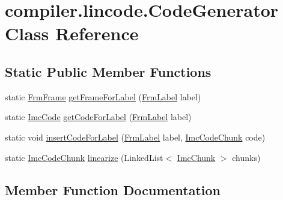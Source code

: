 \hypertarget{classcompiler_1_1lincode_1_1_code_generator}{}\section{compiler.\+lincode.\+Code\+Generator Class Reference}
\label{classcompiler_1_1lincode_1_1_code_generator}
\subsection*{Static Public Member Functions}
\begin{DoxyCompactItemize}
\item 
static \hyperlink{classcompiler_1_1frames_1_1_frm_frame}{Frm\+Frame} \hyperlink{classcompiler_1_1lincode_1_1_code_generator_a50a5eb8c751616ca66441a5f7a6eeebb}{get\+Frame\+For\+Label} (\hyperlink{classcompiler_1_1frames_1_1_frm_label}{Frm\+Label} label)
\item 
static \hyperlink{interfacecompiler_1_1imcode_1_1_imc_code}{Imc\+Code} \hyperlink{classcompiler_1_1lincode_1_1_code_generator_ab7e4686779d00b983e977ef7556802d5}{get\+Code\+For\+Label} (\hyperlink{classcompiler_1_1frames_1_1_frm_label}{Frm\+Label} label)
\item 
static void \hyperlink{classcompiler_1_1lincode_1_1_code_generator_afd4e9211f3d4ddf920c243579d941803}{insert\+Code\+For\+Label} (\hyperlink{classcompiler_1_1frames_1_1_frm_label}{Frm\+Label} label, \hyperlink{classcompiler_1_1imcode_1_1_imc_code_chunk}{Imc\+Code\+Chunk} code)
\item 
static \hyperlink{classcompiler_1_1imcode_1_1_imc_code_chunk}{Imc\+Code\+Chunk} \hyperlink{classcompiler_1_1lincode_1_1_code_generator_ab7ec8e2a5e4ddc174373d321d76c4759}{linearize} (Linked\+List$<$ \hyperlink{classcompiler_1_1imcode_1_1_imc_chunk}{Imc\+Chunk} $>$ chunks)
\end{DoxyCompactItemize}


\subsection{Member Function Documentation}
\mbox{\label{classcompiler_1_1lincode_1_1_code_generator_ab7e4686779d00b983e977ef7556802d5}} 
